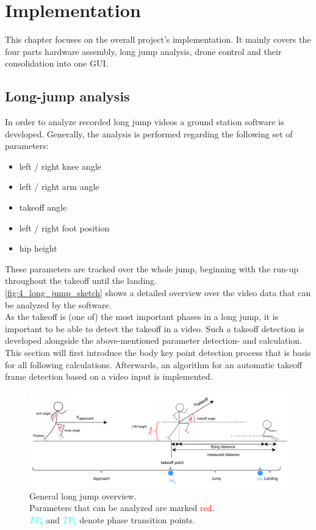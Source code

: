 \graphicspath{{./figures/}}
\chapter{Implementation}\label{chapt:4_implementation}
This chapter focuses on the overall project's implementation.
It mainly covers the four parts hardware assembly, long jump analysis,
drone control and their consolidation into one \ac{GUI}.

\section{Long-jump analysis}\label{sec:4_analysis_software}
In order to analyze recorded long jump videos a ground station software is
developed.
Generally, the analysis is performed regarding the following set of
parameters:
\begin{itemize}
    \item left / right knee angle
    \item left / right arm angle
    \item takeoff angle
    \item left / right foot position
    \item hip height
\end{itemize}
These parameters are tracked over the whole jump, beginning with the run-up
throughout the takeoff until the landing.\\
\autoref{fig:4_long_jump_sketch} shows a detailed overview over the video data
that can be analyzed by the software.\\
As the takeoff is (one of) the most important phases in a long jump, it is
important to be able to detect the takeoff in a video.
Such a takeoff detection is developed alongside the above-mentioned parameter 
detection- and calculation.\\
This section will first introduce the body key point detection process that
is basis for all following calculations.
Afterwards, an algorithm for an automatic takeoff frame detection based on a
video input is implemented.
\begin{figure}[!h]
    \centering
    \includegraphics[scale=0.6]{long_jump_sketch.pdf}
    \caption[Long jump parameter overview]{General long jump overview.\\
    Parameters that can be analyzed are marked \textcolor{red}{red}.\\
    \textcolor{cyan}{$TP_0$} and \textcolor{cyan}{$TP_1$} denote phase
    transition points.}
    \label{fig:4_long_jump_sketch}
\end{figure}
\FloatBarrier

